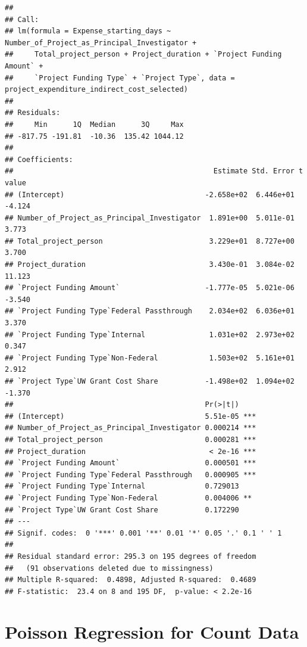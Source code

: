 \documentclass[
]{article}
\begin{document}
\begin{verbatim}
## 
## Call:
## lm(formula = Expense_starting_days ~ Number_of_Project_as_Principal_Investigator + 
##     Total_project_person + Project_duration + `Project Funding Amount` + 
##     `Project Funding Type` + `Project Type`, data = project_expenditure_indirect_cost_selected)
## 
## Residuals:
##     Min      1Q  Median      3Q     Max 
## -817.75 -191.81  -10.36  135.42 1044.12 
## 
## Coefficients:
##                                               Estimate Std. Error t value
## (Intercept)                                 -2.658e+02  6.446e+01  -4.124
## Number_of_Project_as_Principal_Investigator  1.891e+00  5.011e-01   3.773
## Total_project_person                         3.229e+01  8.727e+00   3.700
## Project_duration                             3.430e-01  3.084e-02  11.123
## `Project Funding Amount`                    -1.777e-05  5.021e-06  -3.540
## `Project Funding Type`Federal Passthrough    2.034e+02  6.036e+01   3.370
## `Project Funding Type`Internal               1.031e+02  2.973e+02   0.347
## `Project Funding Type`Non-Federal            1.503e+02  5.161e+01   2.912
## `Project Type`UW Grant Cost Share           -1.498e+02  1.094e+02  -1.370
##                                             Pr(>|t|)    
## (Intercept)                                 5.51e-05 ***
## Number_of_Project_as_Principal_Investigator 0.000214 ***
## Total_project_person                        0.000281 ***
## Project_duration                             < 2e-16 ***
## `Project Funding Amount`                    0.000501 ***
## `Project Funding Type`Federal Passthrough   0.000905 ***
## `Project Funding Type`Internal              0.729013    
## `Project Funding Type`Non-Federal           0.004006 ** 
## `Project Type`UW Grant Cost Share           0.172290    
## ---
## Signif. codes:  0 '***' 0.001 '**' 0.01 '*' 0.05 '.' 0.1 ' ' 1
## 
## Residual standard error: 295.3 on 195 degrees of freedom
##   (91 observations deleted due to missingness)
## Multiple R-squared:  0.4898, Adjusted R-squared:  0.4689 
## F-statistic:  23.4 on 8 and 195 DF,  p-value: < 2.2e-16
\end{verbatim}

\section{Poisson Regression for Count
Data}\label{poisson-regression-for-count-data}
\end{document}
